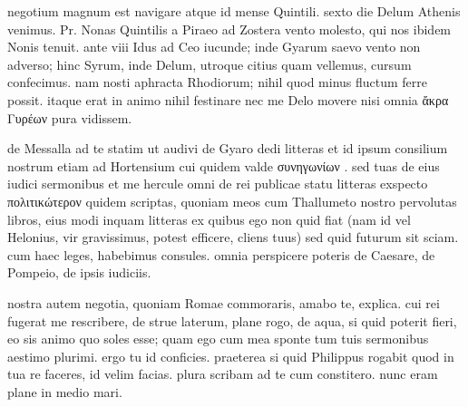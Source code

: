 


 negotium magnum est navigare atque id mense Quintili. sexto die Delum Athenis venimus. Pr. Nonas Quintilis a Piraeo ad Zostera vento molesto, qui nos ibidem Nonis tenuit. ante viii Idus ad Ceo iucunde; inde Gyarum saevo vento non adverso; hinc Syrum, inde Delum, utroque citius quam vellemus, cursum confecimus. nam nosti aphracta Rhodiorum; nihil quod minus fluctum ferre possit. itaque erat in animo nihil festinare nec me Delo movere nisi omnia ἄκρα Γυρέων pura vidissem.

 de Messalla ad te statim ut audivi de Gyaro dedi litteras et id ipsum consilium nostrum etiam ad Hortensium cui quidem valde συνηγωνίων . sed tuas de eius iudici sermonibus et me hercule omni de rei publicae statu litteras exspecto πολιτικώτερον quidem scriptas, quoniam meos cum Thallumeto nostro pervolutas libros, eius modi inquam litteras ex quibus ego non quid fiat (nam id vel Helonius, vir gravissimus, potest efficere, cliens tuus) sed quid futurum sit sciam. cum haec leges, habebimus consules. omnia perspicere poteris de Caesare, de Pompeio, de ipsis iudiciis.

 nostra autem negotia, quoniam Romae commoraris, amabo te, explica. cui rei fugerat me rescribere, de strue laterum, plane rogo, de aqua, si quid poterit fieri, eo sis animo quo soles esse; quam ego cum mea sponte tum tuis sermonibus aestimo plurimi. ergo tu id conficies. praeterea si quid Philippus rogabit quod in tua re faceres, id velim facias. plura scribam ad te cum constitero. nunc eram plane in medio mari.

